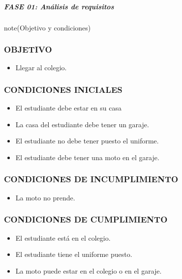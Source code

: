 \documentclass[letterpaper,10pt,spanish]{sphinxmanual}
\begin{document}
\subparagraph{FASE 01: Análisis de requisitos}
\label{\detokenize{cursos/ofimatica11/recursos/T03:fase-01-analisis-de-requisitos}}
\begin{sphinxadmonition}{note}{(Objetivo y condiciones)}
\subsubsection*{OBJETIVO}
\begin{itemize}
\item {} 
\sphinxAtStartPar
Llegar al colegio.

\end{itemize}
\subsubsection*{CONDICIONES INICIALES}
\begin{itemize}
\item {} 
\sphinxAtStartPar
El estudiante debe estar en su casa

\item {} 
\sphinxAtStartPar
La casa del estudiante debe tener un garaje.

\item {} 
\sphinxAtStartPar
El estudiante no debe tener puesto el uniforme.

\item {} 
\sphinxAtStartPar
El estudiante debe tener una moto en el garaje.

\end{itemize}
\subsubsection*{CONDICIONES DE INCUMPLIMIENTO}
\begin{itemize}
\item {} 
\sphinxAtStartPar
La moto no prende.

\end{itemize}
\subsubsection*{CONDICIONES DE CUMPLIMIENTO}
\begin{itemize}
\item {} 
\sphinxAtStartPar
El estudiante está en el colegio.

\item {} 
\sphinxAtStartPar
El estudiante tiene el uniforme puesto.

\item {} 
\sphinxAtStartPar
La moto puede estar en el colegio o en el garaje.

\end{itemize}
\end{sphinxadmonition}
\end{document}
